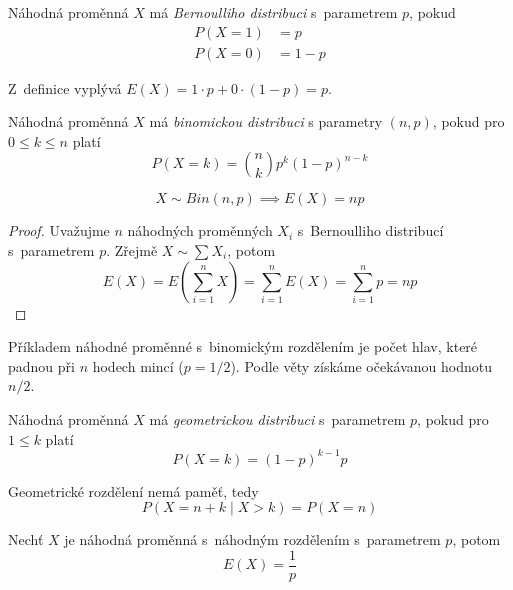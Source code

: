 \begin{definition}
    Náhodná proměnná $X$ má {\em Bernoulliho distribuci} s~parametrem
    $p$, pokud
    \begin{align*}
        P(X = 1) &= p  \\
        P(X = 0) &= 1 - p
    \end{align*}
\end{definition}

Z~definice vyplývá $E(X) = 1 \cdot p + 0 \cdot (1-p) = p$.

\begin{definition}
    Náhodná proměnná $X$ má {\em binomickou distribuci} s parametry $(n, p)$,
    pokud pro $0 \leq k \leq n$ platí
\[
    P(X = k) = \binom{n}{k} p^k (1 - p)^{n - k}
\]
\end{definition}

\begin{theorem}
    \[
        X \sim Bin(n,p) \implies E(X) = np
    \]
\end{theorem}

\begin{proof}
    Uvažujme $n$ náhodných proměnných $X_i$ s~Bernoulliho distribucí
    s~parametrem $p$.
    Zřejmě $X \sim \sum X_i$, potom
    \[
        E(X) = E( \sum_{i = 1}^{n} X )
             = \sum_{i = 1}^{n} E(X)
             = \sum_{i = 1}^{n} p
             = n p
    \]
\end{proof}

\begin{example}
    Příkladem náhodné proměnné s~binomickým rozdělením je
    počet hlav, které padnou při $n$ hodech mincí ($p = 1/2$).
    Podle věty získáme očekávanou hodnotu $n/2$.
\end{example}

\begin{definition}
    Náhodná proměnná $X$ má {\em geometrickou distribuci} s~parametrem
    $p$, pokud pro $1 \leq k$ platí
\[
    P(X = k) = (1-p)^{k-1} p
\]
\end{definition}

\begin{claim}
    Geometrické rozdělení nemá paměť, tedy
    \[
        P(X = n + k \mid X > k) = P(X = n)
    \]
\end{claim}

\begin{theorem}
    Nechť $X$ je náhodná proměnná s~náhodným rozdělením s~parametrem
    $p$, potom
    \[
        E(X) = \frac{1}{p}
    \]
\end{theorem}

